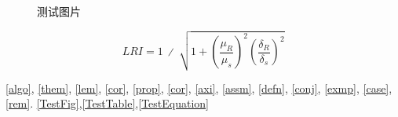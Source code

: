\documentclass[type=bachelor]{bithesis}
\begin{document}
\begin{figure}[htbp]
  \caption{测试图片}\label{TestFig}
\end{figure}
\begin{table}[htbp]
  \caption{统计表}\label{TestTable}
\end{table}
\begin{equation}
  LRI=1\ ∕\ \sqrt{1+{\left(\frac{{\mu }_{R}}{{\mu }_{s}}\right)}^{2}{\left(\frac{{\delta }_{R}}{{\delta }_{s}}\right)}^{2}}
  \label{TestEquation}
\end{equation}



\autoref{algo}, \autoref{them}, \autoref{lem}, \autoref{cor}, \autoref{prop}, \autoref{cor}, \autoref{axi}, \autoref{assm}, \autoref{defn}, \autoref{conj}, \autoref{exmp}, \autoref{case}, \autoref{rem}.
\autoref{TestFig},\autoref{TestTable},\autoref{TestEquation}
\end{document}
